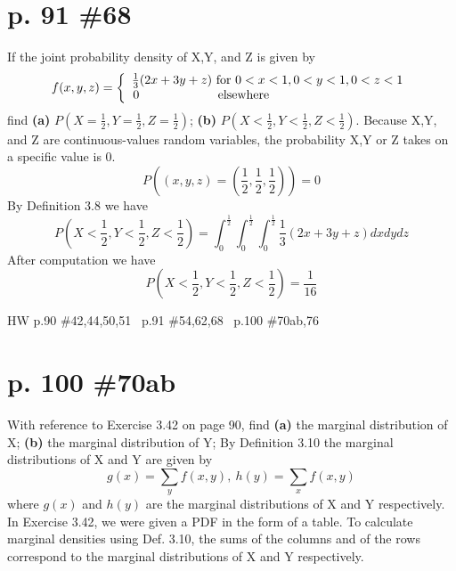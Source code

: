 \documentclass[12pt]{article}
\begin{document}
\section[20pt]{p. 91 \#68}
If the joint probability density of X,Y, and Z is given by
\[f(x,y,z)=\left\{\begin{array}{ccc}
\frac{1}{3}(2x+3y+z) \textup{ for }0<x<1,0<y<1,0<z<1\\0 \ \ \ \ \ \ \ \ \ \ \ \ \ \ \ \ \ \ \textup{ elsewhere\ \ \ \ \ \ \ \ \ \ \ \ \ \ \ \ \ \ \ \ \ \ \ \ \ \ \ \ \ \ \ \ }
\end{array}\right.\]
find \newline
\textbf{(a)} \(P(X=\frac{1}{2},Y=\frac{1}{2},Z=\frac{1}{2})\); \newline
\textbf{(b)} \(P(X<\frac{1}{2},Y<\frac{1}{2},Z<\frac{1}{2})\). \newline
\newline
Because X,Y, and Z are continuous-values random variables, the probability X,Y or Z takes on a specific value is 0.
\[P((x,y,z)=(\frac{1}{2},\frac{1}{2},\frac{1}{2}))=0\]
By Definition 3.8 we have
\[P(X<\frac{1}{2},Y<\frac{1}{2},Z<\frac{1}{2})=\int_0^\frac{1}{2}\int_0^\frac{1}{2}\int_0^\frac{1}{2}\frac{1}{3}(2x+3y+z)dxdydz\]
After computation we have
\[P(X<\frac{1}{2},Y<\frac{1}{2},Z<\frac{1}{2})=\frac{1}{16}\]
\newpage
\maketitle HW p.90 \#42,44,50,51 \ p.91 \#54,62,68 \ p.100 \#70ab,76
\section[20pt]{p. 100 \#70ab}
With reference to Exercise 3.42 on page 90, find \newline
\textbf{(a)} the marginal distribution of X; \newline
\textbf{(b)} the marginal distribution of Y; \newline
\newline
By Definition 3.10 the marginal distributions of X and Y are given by
\[g(x)=\sum_yf(x,y),\ h(y)=\sum_xf(x,y)\]
where \(g(x)\) and \(h(y)\) are the marginal distributions of X and Y respectively. \newline
In Exercise 3.42, we were given a PDF in the form of a table. To calculate marginal densities using Def. 3.10, the sums of the columns and of the rows correspond to the marginal distributions of X and Y respectively.
\end{document}
